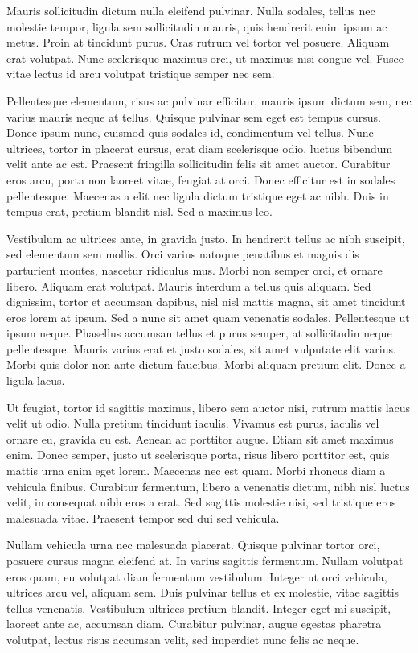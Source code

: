 
Mauris sollicitudin dictum nulla eleifend pulvinar. Nulla sodales, tellus nec molestie tempor,
ligula sem sollicitudin mauris, quis hendrerit enim ipsum ac metus. Proin at tincidunt purus.
Cras rutrum vel tortor vel posuere. Aliquam erat volutpat. Nunc scelerisque maximus orci,
ut maximus nisi congue vel. Fusce vitae lectus id arcu volutpat tristique semper nec sem.


Pellentesque elementum, risus ac pulvinar efficitur, mauris ipsum dictum sem, nec varius
mauris neque at tellus. Quisque pulvinar sem eget est tempus cursus. Donec ipsum nunc, euismod
quis sodales id, condimentum vel tellus. Nunc ultrices, tortor in placerat cursus, erat
diam scelerisque odio, luctus bibendum velit ante ac est. Praesent fringilla sollicitudin
felis sit amet auctor. Curabitur eros arcu, porta non laoreet vitae, feugiat at orci. Donec
efficitur est in sodales pellentesque. Maecenas a elit nec ligula dictum tristique eget
ac nibh. Duis in tempus erat, pretium blandit nisl. Sed a maximus leo.

Vestibulum ac ultrices ante, in gravida justo. In hendrerit tellus ac nibh suscipit, sed
elementum sem mollis. Orci varius natoque penatibus et magnis dis parturient montes, nascetur
ridiculus mus. Morbi non semper orci, et ornare libero. Aliquam erat volutpat. Mauris interdum
a tellus quis aliquam. Sed dignissim, tortor et accumsan dapibus, nisl nisl mattis magna,
sit amet tincidunt eros lorem at ipsum. Sed a nunc sit amet quam venenatis sodales. Pellentesque
ut ipsum neque. Phasellus accumsan tellus et purus semper, at sollicitudin neque pellentesque.
Mauris varius erat et justo sodales, sit amet vulputate elit varius. Morbi quis dolor non
ante dictum faucibus. Morbi aliquam pretium elit. Donec a ligula lacus.


Ut feugiat, tortor id sagittis maximus, libero sem auctor nisi, rutrum mattis
lacus velit ut odio. Nulla pretium tincidunt iaculis. Vivamus est purus, iaculis vel ornare
eu, gravida eu est. Aenean ac porttitor augue. Etiam sit amet maximus enim. Donec semper,
justo ut scelerisque porta, risus libero porttitor est, quis mattis urna enim eget lorem.
Maecenas nec est quam. Morbi rhoncus diam a vehicula finibus. Curabitur fermentum, libero
a venenatis dictum, nibh nisl luctus velit, in consequat nibh eros a erat. Sed sagittis
molestie nisi, sed tristique eros malesuada vitae. Praesent tempor sed dui sed vehicula.

Nullam vehicula urna nec malesuada placerat. Quisque pulvinar tortor orci, posuere cursus
magna eleifend at. In varius sagittis fermentum. Nullam volutpat eros quam, eu volutpat
diam fermentum vestibulum. Integer ut orci vehicula, ultrices arcu vel, aliquam sem. Duis
pulvinar tellus et ex molestie, vitae sagittis tellus venenatis. Vestibulum ultrices pretium
blandit. Integer eget mi suscipit, laoreet ante ac, accumsan diam. Curabitur pulvinar, augue
egestas pharetra volutpat, lectus risus accumsan velit, sed imperdiet nunc felis ac neque.
